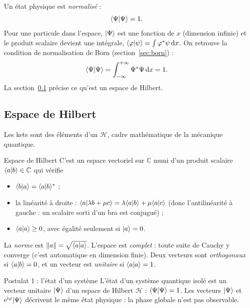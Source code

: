 Un état physique est \emph{normalisé} :
\[
  \langle \Psi|\Psi\rangle=1 .
\]
Pour une particule dans l'espace, $|\Psi\rangle$ est une fonction de $x$ (dimension
infinie) et le produit scalaire devient une intégrale,
$\langle \varphi|\psi\rangle=\int\varphi^*\psi\,\mathrm{d} x$. On retrouve la condition de
normalisation de Born (section~\ref{sec:born}) :
\[
  \langle \Psi|\Psi\rangle = \int_{-\infty}^{+\infty}\Psi^*\Psi\,\mathrm{d} x = 1 .
\]
La section~\ref{sec:hilbert} précise ce qu'est un espace de Hilbert.

\subsection{Espace de Hilbert}\label{sec:hilbert}

Les kets sont des éléments d'un  $\mathcal{H}$, cadre
mathématique de la mécanique quantique.

\begin{definition}{Espace de Hilbert}
C'est un espace vectoriel sur $\mathbb{C}$ muni d'un produit scalaire $\langle a|b\rangle\in\mathbb{C}$
qui vérifie
\begin{itemize}[nosep]
  \item $\langle b|a\rangle=\langle a|b\rangle^*$ ;
  \item la linéarité à droite : $\langle a|\lambda b+\mu c\rangle=\lambda\langle a|b\rangle+\mu\langle a|c\rangle$
        (donc l'antilinéarité à gauche : un scalaire sorti d'un bra est conjugué) ;
  \item $\langle a|a\rangle\geq0$, avec égalité seulement si $|a\rangle=0$.
\end{itemize}
La \emph{norme} est $\|a\|=\sqrt{\langle a|a\rangle}$. L'espace est \emph{complet} : toute suite de
Cauchy y converge (c'est automatique en dimension finie). Deux vecteurs sont \emph{orthogonaux}
si $\langle a|b\rangle=0$, et un vecteur est \emph{unitaire} si $\langle a|a\rangle=1$.
\end{definition}

\begin{resultat}{Postulat 1 : l'état d'un système}
L'état d'un système quantique isolé est un vecteur unitaire $|\Psi\rangle$ d'un espace de Hilbert
$\mathcal{H}$ : $\langle \Psi|\Psi\rangle=1$. Les vecteurs $|\Psi\rangle$ et $\mathrm{e}^{\mathrm{i}\varphi}|\Psi\rangle$
décrivent le même état physique : la phase globale n'est pas observable.
\end{resultat}

